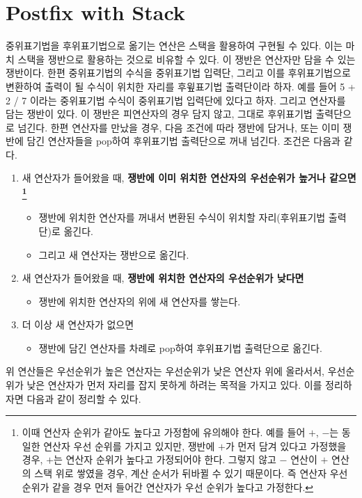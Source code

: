\documentclass{article}
\begin{document}
\section{Postfix with Stack} \label{Postfix with Stack}
중위표기법을 후위표기법으로 옮기는 연산은 스택을 활용하여 구현될 수 있다. 이는 마치 스택을 쟁반으로 활용하는 것으로 비유할 수 있다. 이 쟁반은 연산자만 담을 수 있는 쟁반이다. 한편 중위표기법의 수식을 중위표기법 입력단, 그리고 이를 후위표기법으로 변환하여 출력이 될 수식이 위치한 자리를 후윞표기법 출력단이라 하자. 예를 들어 5 + 2 / 7 이라는 중위표기법 수식이 중위표기법 입력단에 있다고 하자. 그리고 연산자를 담는 쟁반이 있다. 이 쟁반은 피연산자의 경우 담지 않고, 그대로 후위표기법 출력단으로 넘긴다. 한편 연산자를 만났을 경우, 다음 조건에 따라 쟁반에 담거나, 또는 이미 쟁반에 담긴 연산자들을 pop하여 후위표기법 출력단으로 꺼내 넘긴다. 조건은 다음과 같다.
\begin{enumerate}
    \item 새 연산자가 들어왔을 때, \textbf{쟁반에 이미 위치한 연산자의 우선순위가 높거나 같으면\footnote{이때 연산자 순위가 같아도 높다고 가정함에 유의해야 한다. 예를  들어 $+$, $-$는 동일한 연산자 우선 순위를 가지고 있지만, 쟁반에 $+$가 먼저 담겨 있다고 가정했을 경우, $+$는 연산자 순위가 높다고 가정되어야 한다. 그렇지 않고 $-$ 연산이 $+$ 연산의 스택 위로 쌓였을 경우, 계산 순서가 뒤바뀔 수 있기 때문이다. 즉 연산자 우선 순위가 같을 경우 먼저 들어간 연산자가 우선 순위가 높다고 가정한다.}}
    \begin{itemize}
        \item 쟁반에 위치한 연산자를 꺼내서 변환된 수식이 위치할 자리(후위표기법 출력단)로 옮긴다.
        \item 그리고 새 연산자는 쟁반으로 옮긴다.
    \end{itemize}
    \item 새 연산자가 들어왔을 때, \textbf{쟁반에 위치한 연산자의 우선순위가 낮다면}
    \begin{itemize}
        \item 쟁반에 위치한 연산자의 위에 새 연산자를 쌓는다.
    \end{itemize}
    \item 더 이상 새 연산자가 없으면
    \begin{itemize}
        \item 쟁반에 담긴 연산자를 차례로 pop하여 후위표기법 출력단으로 옮긴다.
    \end{itemize}
\end{enumerate}
위 연산들은 우선순위가 높은 연산자는 우선순위가 낮은 연산자 위에 올라서서, 우선순위가 낮은 연산자가 먼저 자리를 잡지 못하게 하려는 목적을 가지고 있다. 이를 정리하자면 다음과 같이 정리할 수 있다.
\end{document}
